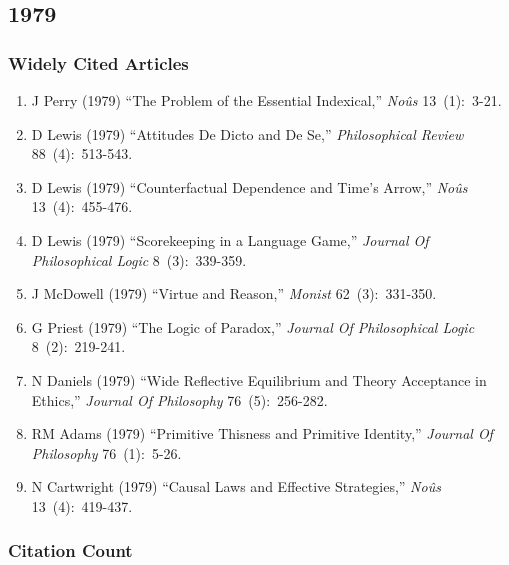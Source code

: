 \documentclass[
  10pt,
  letterpaper,
  DIV=11,
  numbers=noendperiod,
  twoside]{scrartcl}
\providecommand{\tightlist}{%
  \setlength{\itemsep}{0pt}\setlength{\parskip}{0pt}}\usepackage{longtable,booktabs,array}
\begin{document}
\newpage

\subsection{1979}\label{sec-s1979}

\subsubsection*{Widely Cited Articles}\label{widely-cited-articles-23}

\begin{enumerate}
\def\labelenumi{\arabic{enumi}.}
\tightlist
\item
  J Perry (1979) ``The Problem of the Essential Indexical,'' \emph{Noûs}
  13~(1):~3-21.
\item
  D Lewis (1979) ``Attitudes De Dicto and De Se,'' \emph{Philosophical
  Review} 88~(4):~513-543.
\item
  D Lewis (1979) ``Counterfactual Dependence and Time's Arrow,''
  \emph{Noûs} 13~(4):~455-476.
\item
  D Lewis (1979) ``Scorekeeping in a Language Game,'' \emph{Journal Of
  Philosophical Logic} 8~(3):~339-359.
\item
  J McDowell (1979) ``Virtue and Reason,'' \emph{Monist}
  62~(3):~331-350.
\item
  G Priest (1979) ``The Logic of Paradox,'' \emph{Journal Of
  Philosophical Logic} 8~(2):~219-241.
\item
  N Daniels (1979) ``Wide Reflective Equilibrium and Theory Acceptance
  in Ethics,'' \emph{Journal Of Philosophy} 76~(5):~256-282.
\item
  RM Adams (1979) ``Primitive Thisness and Primitive Identity,''
  \emph{Journal Of Philosophy} 76~(1):~5-26.
\item
  N Cartwright (1979) ``Causal Laws and Effective Strategies,''
  \emph{Noûs} 13~(4):~419-437.
\end{enumerate}

\subsubsection*{Citation Count}\label{sec-count-1979}
\end{document}
